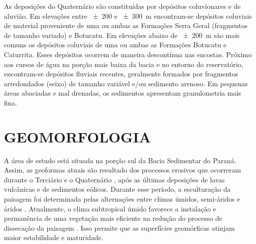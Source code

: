 As deposições do Quaternário são constituídas por depósitos coluvionares e de aluvião. Em elevações entre 
\num{\pm200} e \SI{\pm300}{\metre} encontram-se depósitos coluviais de material proveniente de uma ou ambas as 
Formações Serra Geral (fragmentos de tamanho variado) e Botucatu. Em elevações abaixo de \SI{\pm200}{\metre} 
são mais comuns os depósitos coluviais de uma ou ambas as Formações Botucatu e Caturrita. Esses depósitos 
ocorrem de maneira descontínua nas encostas. Próximo aos cursos de água na porção mais baixa da bacia e no 
entorno do reservatório, encontram-se depósitos fluviais recentes, geralmente formados por fragmentos 
arredondados (seixo) de tamanho variável e/ou sedimento arenoso. Em pequenas áreas abaciadas e mal drenadas, 
os sedimentos apresentam granulometria mais fina.

\section{GEOMORFOLOGIA}
\label{sec:chap02-geomorfologia}

A área de estudo está situada na porção sul da Bacia Sedimentar do Paraná. Assim, as geoformas atuais são 
resultado dos processos erosivos que ocorreram durante o Terciário e o Quaternário \cite{Sartori2009}, após as 
últimas deposições de lavas vulcânicas e de sedimentos eólicos. Durante esse período, a esculturação da 
paisagem foi determinada pelas alternações entre climas úmidos, semi-áridos e áridos \cite{Sartori2009}. 
Atualmente, o clima subtropical úmido favorece a instalação e permanência de uma vegetação mais eficiente na 
redução do processo de dissecação da paisagem \cite{Sartori2009, NascimentoEtAl2010}. Isso permite que as 
superfícies geomórficas atinjam maior estabilidade e maturidade.


